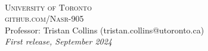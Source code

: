 \documentclass[openany,11pt,fleqn]{book} %
\begin{document}

\newpage
~\vfill
\thispagestyle{empty}


\noindent\textsc{University of Toronto}\\

\noindent \textsc{github.com/Nasr-905}\\ %

\noindent Professor: Tristan Collins (tristan.collins@utoronto.ca)\\ %

\noindent \textit{First release, September 2024} %



\pagestyle{empty} %

\tableofcontents %


\pagestyle{fancy} %
























\end{document}
